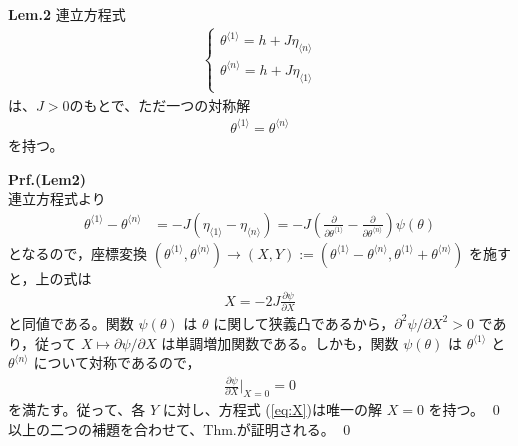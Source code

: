 \documentclass[a4paper,11pt]{jsarticle}
\numberwithin{equation}{section}
\begin{document}
\begin{itembox}[l]{\textbf{Lem.2}}
    連立方程式
\begin{align}
    \begin{cases}
        \theta^{\langle 1 \rangle}  = h + J \eta_{\langle n \rangle} \\
        \theta^{\langle n \rangle}  = h + J \eta_{\langle 1 \rangle} \\
    \end{cases}
\end{align}
は、$J>0$のもとで、ただ一つの対称解
\begin{align}
    \theta^{\langle 1 \rangle} = \theta^{\langle n \rangle} 
\end{align}
を持つ。
\end{itembox}
\textbf{Prf.(Lem2)}\\
連立方程式より
\begin{align}
\theta^{\langle 1 \rangle} - \theta^{\langle n \rangle} &= -J \left( \eta_{\langle 1 \rangle} - \eta_{\langle n \rangle} \right) = -J \left( \frac{\partial}{\partial \theta^{\langle 1 \rangle}} - \frac{\partial}{\partial \theta^{\langle n \rangle}} \right) \psi(\theta)
\end{align}
となるので，座標変換 $(\theta^{\langle 1 \rangle}, \theta^{\langle n \rangle}) \to (X,Y) := (\theta^{\langle 1 \rangle} - \theta^{\langle n \rangle}, \theta^{\langle 1 \rangle} + \theta^{\langle n \rangle})$ を施すと，上の式は
\begin{align}
X = -2J \frac{\partial \psi}{\partial X} \label{eq:X}
\end{align}
と同値である。関数 $\psi(\theta)$ は $\theta$ に関して狭義凸であるから，$\partial^2 \psi / \partial X^2 > 0$ であり，従って $X \mapsto \partial \psi / \partial X$ は単調増加関数である。しかも，関数 $\psi(\theta)$ は $\theta^{\langle 1 \rangle}$ と $\theta^{\langle n \rangle}$ について対称であるので，
\begin{align}
\frac{\partial \psi}{\partial X} \bigg|_{X=0} = 0
\end{align}
を満たす。従って、各 $Y$ に対し、方程式 (\ref{eq:X})は唯一の解 $X = 0$ を持つ。
\qed\\
以上の二つの補題を合わせて、Thm.が証明される。
\qed
\end{document}
